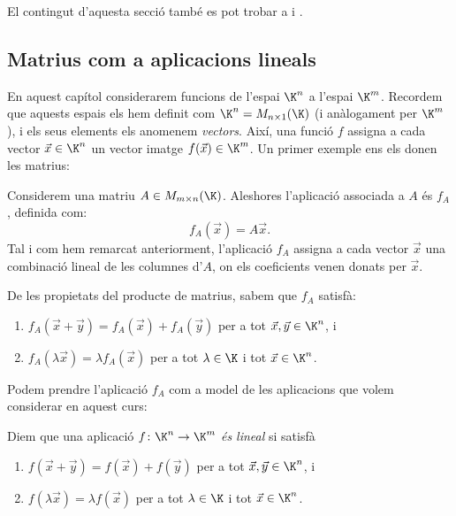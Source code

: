 El contingut d'aquesta secció també es pot trobar a \cite[Secció 2.2]{Bret} i \cite[Temes 2, 3, 4]{NaXa}.


\subsection{Matrius com a aplicacions lineals}\label{subsec:matriusapl}
En aquest capítol considerarem funcions de l'espai $\K^n$ a l'espai $\K^m$. Recordem que aquests espais els hem definit com $\K^n=M_{n\times 1}(\K)$ (i anàlogament per $\K^m$), i els seus elements els anomenem \emph{vectors}. Així, una funció $f$ assigna a cada vector $\vec x\in \K^n$ un vector imatge $f(\vec x)\in \K^m$. Un primer exemple ens els donen les matrius:

\begin{exemple}\label{exemple:Alineal}
	Considerem una matriu $A\in M_{m\times n}(\K)$. Aleshores l'aplicació associada a $A$ és $f_A$, definida com:
	\[
	f_A(\vec x) = A\vec x.
	\]
	Tal i com hem remarcat anteriorment, l'aplicació $f_A$ assigna a cada vector $\vec x$ una combinació lineal de les columnes d'$A$, on els coeficients venen donats per $\vec x$.
	
	De les propietats del producte de matrius, sabem que $f_A$ satisfà:
	\begin{enumerate}
		\item $f_A(\vec x+\vec y) = f_A(\vec x) + f_A(\vec y)$ per a tot $\vec x, \vec y \in \K^n$, i
		\item $f_A(\lambda \vec x) = \lambda f_A(\vec x)$ per a tot $\lambda\in\K$ i tot $\vec x\in \K^n$.
	\end{enumerate}
\end{exemple}
Podem prendre l'aplicació $f_A$ com a model de les aplicacions que volem considerar en aquest curs:

\begin{definicio}\label{def:aplicaciolinealKn}
	Diem que una aplicació $f\colon \K^n\to \K^m$ \emph{és lineal} si satisfà
	\begin{enumerate}
		\item $f(\vec x+\vec y) = f(\vec x) + f(\vec y)$ per a tot $\vec x, \vec y \in \K^n$, i
		\item $f(\lambda \vec x) = \lambda f(\vec x)$ per a tot $\lambda\in\K$ i tot $\vec x\in \K^n$.
	\end{enumerate}
\end{definicio}

